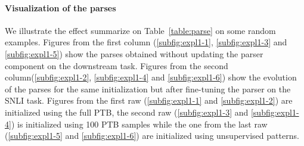 \paragraph{Visualization of the parses} We illustrate the effect summarize on Table~\ref{table:parse} on some random examples. Figures from the first column (\ref{subfig:expl1-1}, \ref{subfig:expl1-3} and \ref{subfig:expl1-5}) show the parses obtained without updating the parser component on the downstream task. Figures from the second column(\ref{subfig:expl1-2}, \ref{subfig:expl1-4} and \ref{subfig:expl1-6}) show the evolution of the parses for the same initialization but after fine-tuning the parser on the SNLI task. Figures from the first raw (\ref{subfig:expl1-1} and \ref{subfig:expl1-2}) are initialized using the full PTB, the second raw (\ref{subfig:expl1-3} and \ref{subfig:expl1-4}) is initialized using 100 PTB samples while the one from the last raw (\ref{subfig:expl1-5} and \ref{subfig:expl1-6}) are initialized using unsupervised patterns.


